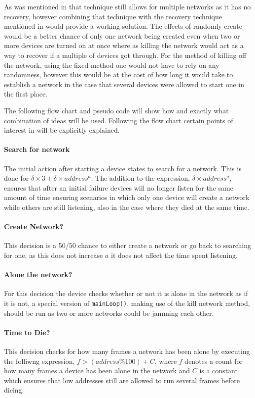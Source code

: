 \bigskip \noindent
As was mentioned in  that technique still allows for multiple networks as it has no recovery, however combining that technique with the recovery technique mentioned in  would provide a working solution.
The effects of randomly create would be a better chance of only one network being created even when two or more devices are turned on at once where as killing the network would act as a way to recover if a multiple of devices got through.
For the method of killing off the network, using the fixed method one would not have to rely on any randomness, however this would be at the cost of how long it would take to establish a network in the case that several devices were allowed to start one in the first place.

The following flow chart and pseudo code will show how and exactly what combination of ideas will be used.
Following the flow chart certain points of interest in  will be explicitly explained.

\paragraph{Search for network}
The initial action after starting a device states to search for a network.
This is done for $\delta \times 3 + \delta \times address^a$. 
The addition to the expression, $\delta \times address^a$, ensures that after an initial failure devices will no longer listen for the same amount of time ensuring scenarios in which only one device will create a network while others are still listening, also in the case where they died at the same time.
\paragraph{Create Network?}
This decision is a 50/50 chance to either create a network or go back to searching for one, as this does not increase $a$ it does not affect the time spent listening.
\paragraph{Alone the network?}
For this decision the device checks whether or not it is alone in the network as if it is not, a special version of \texttt{mainLoop()}, making use of the kill network method, should be run as two or more networks could be jamming each other.
\paragraph{Time to Die?}
This decision checks for how many frames a network has been alone by executing the folliwng expression, $f > (address \% 100) + C$, where $f$ denotes a count for how many frames a device has been alone in the network and $C$ is a constant which ensures that low addresses still are allowed to run several frames before dieing.